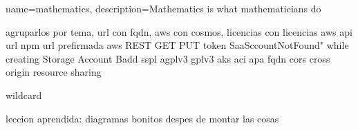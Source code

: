\usepackage{glossaries}

\makeglossaries


{
    name=mathematics,
    description={Mathematics is what mathematicians do}
}

agruparlos por tema, url con fqdn, aws con cosmos, licencias con licencias
aws
api
url
npm
url prefirmada
aws
REST
GET
PUT
token
SaaSccountNotFound" while creating Storage Account
Badd
sspl
agplv3
gplv3
aks
aci
apa
fqdn
cors cross origin resource sharing

wildcard

leccion aprendida: diagramas bonitos despes de montar las cosas
